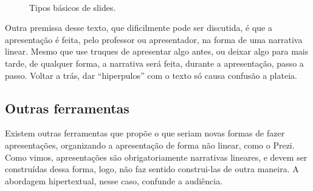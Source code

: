 \begin{figure}[hbt]
    \centering
    \\
    \caption{Tipos básicos de slides.}
    \label{fig:tiposbasicos}
\end{figure}

Outra premissa desse texto, que dificilmente pode ser discutida, é que a apresentação é feita, pelo professor ou apresentador, na forma de uma narrativa linear.
Mesmo que use truques de apresentar algo antes, ou deixar algo para mais tarde, de qualquer forma, a narrativa será feita, durante a apresentação, passo a passo.
Voltar a trás, dar ``hiperpulos'' com o texto só causa confusão a plateia.

\subsection{Outras ferramentas}

Existem outras ferramentas que propõe o que seriam novas formas de fazer apresentações, organizando a apresentação de forma não linear, como o Prezi.
Como vimos, apresentações são obrigatoriamente narrativas lineares, e devem ser construídas dessa forma, logo, não faz sentido construi-las de outra maneira.
A abordagem hipertextual, nesse caso, confunde a audiência.